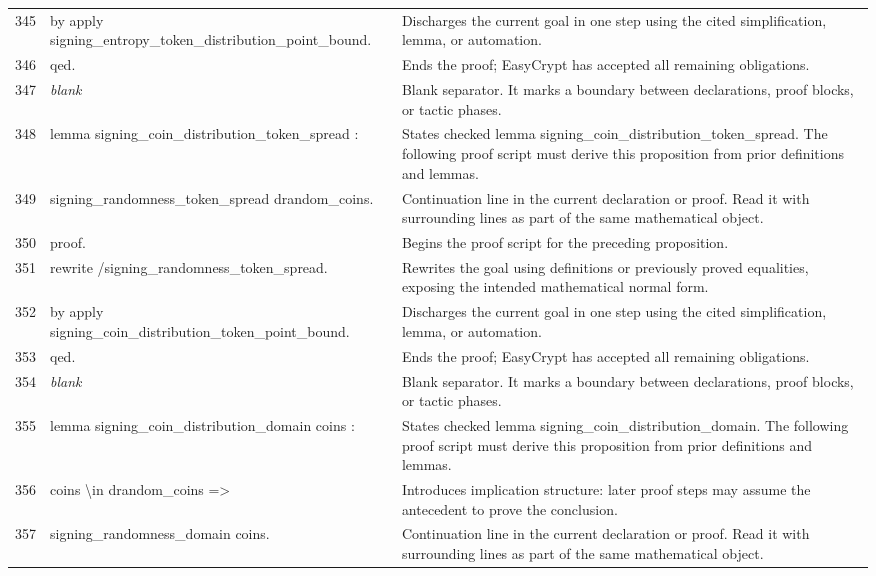 \documentclass[10pt]{article}
\begin{document}
\begin{longtable}{r L{0.53\textwidth} L{0.37\textwidth}}
345 & {\ttfamily\scriptsize by apply signing\_entropy\_token\_distribution\_point\_bound.} & Discharges the current goal in one step using the cited simplification, lemma, or automation. \\
346 & {\ttfamily\scriptsize qed.} & Ends the proof; EasyCrypt has accepted all remaining obligations. \\
347 & {\ttfamily\scriptsize \emph{blank}} & Blank separator.  It marks a boundary between declarations, proof blocks, or tactic phases. \\
348 & {\ttfamily\scriptsize lemma signing\_coin\_distribution\_token\_spread :} & States checked lemma signing\_coin\_distribution\_token\_spread.  The following proof script must derive this proposition from prior definitions and lemmas. \\
349 & {\ttfamily\scriptsize   signing\_randomness\_token\_spread drandom\_coins.} & Continuation line in the current declaration or proof.  Read it with surrounding lines as part of the same mathematical object. \\
350 & {\ttfamily\scriptsize proof.} & Begins the proof script for the preceding proposition. \\
351 & {\ttfamily\scriptsize rewrite /signing\_randomness\_token\_spread.} & Rewrites the goal using definitions or previously proved equalities, exposing the intended mathematical normal form. \\
352 & {\ttfamily\scriptsize by apply signing\_coin\_distribution\_token\_point\_bound.} & Discharges the current goal in one step using the cited simplification, lemma, or automation. \\
353 & {\ttfamily\scriptsize qed.} & Ends the proof; EasyCrypt has accepted all remaining obligations. \\
354 & {\ttfamily\scriptsize \emph{blank}} & Blank separator.  It marks a boundary between declarations, proof blocks, or tactic phases. \\
355 & {\ttfamily\scriptsize lemma signing\_coin\_distribution\_domain coins :} & States checked lemma signing\_coin\_distribution\_domain.  The following proof script must derive this proposition from prior definitions and lemmas. \\
356 & {\ttfamily\scriptsize   coins \textbackslash{}in drandom\_coins =>} & Introduces implication structure: later proof steps may assume the antecedent to prove the conclusion. \\
357 & {\ttfamily\scriptsize   signing\_randomness\_domain coins.} & Continuation line in the current declaration or proof.  Read it with surrounding lines as part of the same mathematical object. \\

\end{longtable}
\end{document}
